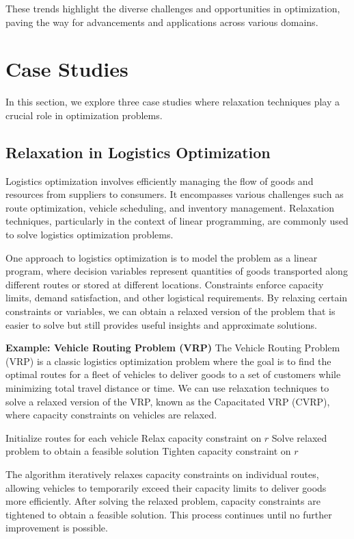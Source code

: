 \documentclass[12pt]{book} %
\begin{document}
These trends highlight the diverse challenges and opportunities in optimization, paving the way for advancements and applications across various domains.


\section{Case Studies}
In this section, we explore three case studies where relaxation techniques play a crucial role in optimization problems.

\subsection{Relaxation in Logistics Optimization}
Logistics optimization involves efficiently managing the flow of goods and resources from suppliers to consumers. It encompasses various challenges such as route optimization, vehicle scheduling, and inventory management. Relaxation techniques, particularly in the context of linear programming, are commonly used to solve logistics optimization problems.

One approach to logistics optimization is to model the problem as a linear program, where decision variables represent quantities of goods transported along different routes or stored at different locations. Constraints enforce capacity limits, demand satisfaction, and other logistical requirements. By relaxing certain constraints or variables, we can obtain a relaxed version of the problem that is easier to solve but still provides useful insights and approximate solutions.

\textbf{Example: Vehicle Routing Problem (VRP)}
The Vehicle Routing Problem (VRP) is a classic logistics optimization problem where the goal is to find the optimal routes for a fleet of vehicles to deliver goods to a set of customers while minimizing total travel distance or time. We can use relaxation techniques to solve a relaxed version of the VRP, known as the Capacitated VRP (CVRP), where capacity constraints on vehicles are relaxed.
\FloatBarrier
\begin{algorithm}
\caption{Relaxation-based Heuristic for CVRP}
\begin{algorithmic}[1]
\State Initialize routes for each vehicle
\Repeat
        \State Relax capacity constraint on $r$
        \State Solve relaxed problem to obtain a feasible solution
        \State Tighten capacity constraint on $r$
    \EndFor
{}
\end{algorithmic}
\end{algorithm}
\FloatBarrier
The algorithm iteratively relaxes capacity constraints on individual routes, allowing vehicles to temporarily exceed their capacity limits to deliver goods more efficiently. After solving the relaxed problem, capacity constraints are tightened to obtain a feasible solution. This process continues until no further improvement is possible.
\end{document}
